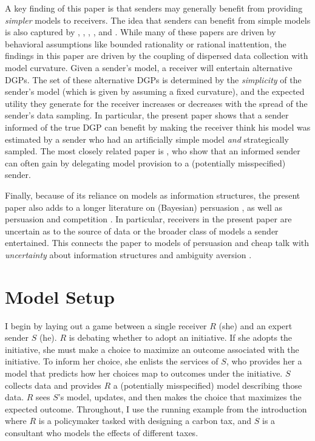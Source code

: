 \documentclass[11pt,dvipsnames]{article}
\begin{document}
A key finding of this paper is that senders may generally benefit from providing \emph{simpler} models to receivers.
The idea that senders can benefit from simple models is also captured by \citet{perez2012complicating}, \citet{bloedel2018persuasion}, \citet{lipnowski2020attention}, \citet{eliaz2021strategic}, and \citet{burkovskaya2026causal}.
While many of these papers are driven by behavioral assumptions like bounded rationality or rational inattention, the findings in this paper are driven by the coupling of dispersed data collection with model curvature. Given a sender's model, a receiver will entertain alternative DGPs.
The set of these alternative DGPs is determined by the \emph{simplicity} of the sender's model (which is given by assuming a fixed curvature), and the expected utility they generate for the receiver increases or decreases with the spread of the sender's data sampling.
In particular, the present paper shows that a sender informed of the true DGP can benefit by making the receiver think his model was estimated by a sender who had an artificially simple model \emph{and} strategically sampled.
The most closely related paper is \citet{gleyze2022value}, who show that an informed sender can often gain by delegating model provision to a (potentially misspecified) sender.

Finally, because of its reliance on models as information structures, the present paper also adds to a longer literature on (Bayesian) persuasion \citep{kamenica2011bayesian}, as well as persuasion and competition \citep{gentzkow2017bayesian,wang2013bayesian}.
In particular, receivers in the present paper are uncertain as to the source of data or the broader class of models a sender entertained.
This connects the paper to models of persuasion and cheap talk with \emph{uncertainty} about information structures \citep{huang2024learning,min2026information} and ambiguity aversion \citep{colo2024communicating}.



\section{Model Setup}\label{section:setup}
I begin by laying out a game between a single receiver $R$ (she) and an expert sender $S$ (he). $R$ is debating whether to adopt an initiative.
If she adopts the initiative, she must make a choice to maximize an outcome associated with the initiative.
To inform her choice, she enlists the services of $S$, who provides her a model that predicts how her choices map to outcomes under the initiative.
$S$ collects data and provides $R$ a (potentially misspecified) model describing those data.
$R$ sees $S$'s model, updates, and then makes the choice that maximizes the expected outcome.
Throughout, I use the running example from the introduction where $R$ is a policymaker tasked with designing a carbon tax, and $S$ is a consultant who models the effects of different taxes.
\end{document}

